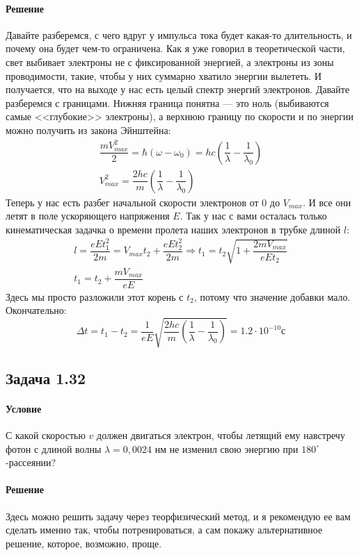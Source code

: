 \documentclass[12pt]{article}
\begin{document}
\paragraph{Решение} Давайте разберемся, с чего вдруг у импульса тока будет какая-то длительность, и почему она будет чем-то ограничена. Как я уже говорил в теоретической части, свет выбивает электроны не с фиксированной энергией, а электроны из зоны проводимости, такие, чтобы у них суммарно хватило энергии вылететь. И получается, что на выходе у нас есть целый спектр энергий электронов. Давайте разберемся с границами. Нижняя граница понятна --- это ноль (выбиваются самые <<глубокие>> электроны), а верхнюю границу по скорости и по энергии можно получить из закона Эйнштейна:
\begin{gather*}
    \dfrac{mV_{max}^2}{2} = \hbar(\omega - \omega_0) = hc\left(\dfrac{1}{\lambda} - \dfrac{1}{\lambda_0} \right)\\
    V^2_{max} = \dfrac{2hc}{m}\left(\dfrac{1}{\lambda} - \dfrac{1}{\lambda_0} \right)
\end{gather*}
Теперь у нас есть разбег начальной скорости электронов от 0 до $V_{max}$. И все они летят в поле ускоряющего напряжения $E$. Так у нас с вами осталась только кинематическая задачка о времени пролета наших электронов в трубке длиной $l$:
\begin{gather*}
    l = \dfrac{eEt_1^2}{2m} = V_{max}t_2 +\dfrac{eEt_2^2}{2m} \Rightarrow t_1 = t_2\sqrt{1+\dfrac{2mV_{max}}{eEt_2}}\\
    t_1 = t_2 + \dfrac{mV_{max}}{eE}
\end{gather*}
Здесь мы просто разложили этот корень с $t_2$, потому что значение добавки мало. Окончательно:
\begin{equation*}
    \Delta t = t_1 - t_2 = \dfrac{1}{eE}\sqrt{\dfrac{2hc}{m}\left(\dfrac{1}{\lambda} - \dfrac{1}{\lambda_0} \right)} = 1.2\cdot10^{-10} \text{с}
\end{equation*}

\subsection{Задача 1.32}
\label{task_132}
\paragraph{Условие} С какой скоростью $v$ должен двигаться электрон, чтобы летящий ему навстречу фотон с длиной волны $\lambda = 0,0024$ нм не изменил свою энергию при $180^\circ$-рассеянии?
\paragraph{Решение}
Здесь можно решить задачу через теорфизический метод, и я рекомендую ее вам сделать именно так, чтобы потренироваться, а сам покажу альтернативное решение, которое, возможно, проще.
\end{document}
